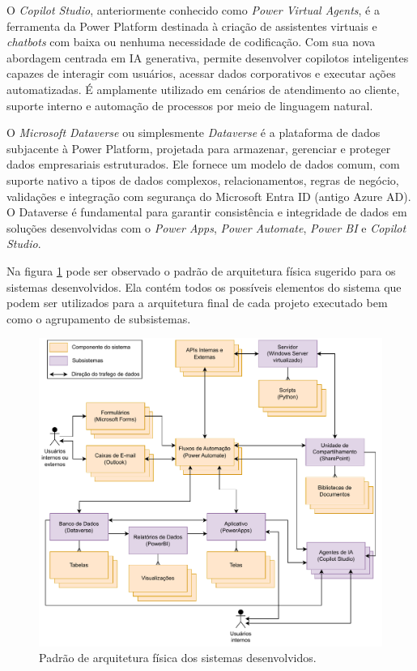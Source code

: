 	O \textit{Copilot Studio}, anteriormente conhecido como \textit{Power Virtual Agents}, é a ferramenta da Power Platform destinada à criação de assistentes virtuais e \textit{chatbots} com
	baixa ou nenhuma necessidade de codificação. Com sua nova abordagem centrada em IA generativa, permite desenvolver copilotos inteligentes capazes de interagir com usuários, acessar dados
	corporativos e executar ações automatizadas. É amplamente utilizado em cenários de atendimento ao cliente, suporte interno e automação de processos por meio de linguagem natural.

	O \textit{Microsoft Dataverse} ou simplesmente \textit{Dataverse} é a plataforma de dados subjacente à Power Platform, projetada para armazenar, gerenciar e proteger dados empresariais estruturados. Ele fornece um modelo de
	dados comum, com suporte nativo a tipos de dados complexos, relacionamentos, regras de negócio, validações e integração com segurança do Microsoft Entra ID (antigo Azure AD). O Dataverse é
	fundamental para garantir consistência e integridade de dados em soluções desenvolvidas com o \textit{Power Apps}, \textit{Power Automate}, \textit{Power BI} e \textit{Copilot Studio}.
	
	Na figura \ref{fig:metodologia:arquiteturaFisica} pode ser observado o padrão de arquitetura física sugerido para os sistemas desenvolvidos. Ela contém todos os possíveis
	elementos do sistema que podem ser utilizados para a arquitetura final de cada projeto executado bem como o agrupamento de subsistemas.
	\begin{figure}[h]
		\centering
		\includegraphics[width=1\textwidth]{./figuras/arquiteturaFisica.pdf}
		\caption{Padrão de arquitetura física dos sistemas desenvolvidos.}
		\label{fig:metodologia:arquiteturaFisica}
	\end{figure}
	
